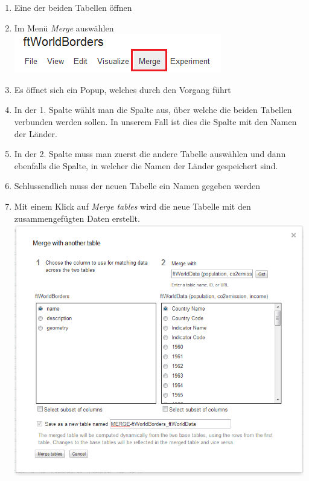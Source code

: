 \begin{enumerate}
\item Eine der beiden Tabellen öffnen
\item Im Menü \emph{Merge} auswählen \\ \includegraphics{images/usecase1-worlddata/documentation/worlddata-merge1.png}
\item Es öffnet sich ein Popup, welches durch den Vorgang führt
\item In der 1. Spalte wählt man die Spalte aus, über welche die beiden Tabellen verbunden werden sollen. In unserem Fall ist dies die Spalte mit den Namen der Länder.
\item In der 2. Spalte muss man zuerst die andere Tabelle auswählen und dann ebenfalls die Spalte, in welcher die Namen der Länder gespeichert sind.
\item Schlussendlich muss der neuen Tabelle ein Namen gegeben werden
\item Mit einem Klick auf \emph{Merge tables} wird die neue Tabelle mit den zusammengefügten Daten erstellt. \\ \includegraphics[scale=0.8]{images/usecase1-worlddata/documentation/worlddata-merge2.png}
\end{enumerate}


